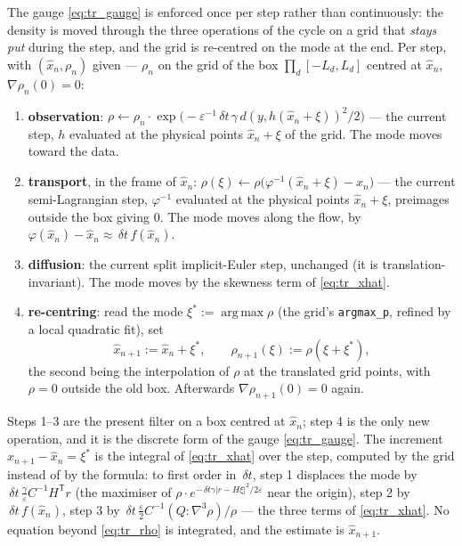 \documentclass[11pt,a4paper]{article}
\newcommand{\argmax}{\operatorname{arg\,max}}
\newcommand{\T}{^{\mathsf T}}
\newcommand{\xh}{\hat{x}}
\newcommand{\eps}{\varepsilon}
\newcommand{\abs}[1]{\left\lvert #1 \right\rvert}
\newcommand{\grad}{\nabla}
\newcommand{\dt}{\,\delta t}
\theoremstyle{plain}
\theoremstyle{definition}
\theoremstyle{remark}
\begin{document}
The gauge \eqref{eq:tr_gauge} is enforced once per step rather than continuously: the density is moved through the three operations of the cycle on a grid that \emph{stays put} during the step, and the grid is re-centred on the mode at the end. Per step, with $(\xh_n,\rho_n)$ given --- $\rho_n$ on the grid of the box $\prod_d[-L_d,L_d]$ centred at $\xh_n$, $\grad\rho_n(0)=0$:
\begin{enumerate}[leftmargin=1.5em,nosep]
  \item \textbf{observation}: $\rho\leftarrow\rho_n\cdot\exp\big(-\eps^{-1}\dt\,\gamma\,d(y,h(\xh_n+\xi))^2/2\big)$ --- the current step, $h$ evaluated at the physical points $\xh_n+\xi$ of the grid. The mode moves toward the data.
  \item \textbf{transport}, in the frame of $\xh_n$: $\rho(\xi)\leftarrow\rho\big(\varphi^{-1}(\xh_n+\xi)-\xh_n\big)$ --- the current semi-Lagrangian step, $\varphi^{-1}$ evaluated at the physical points $\xh_n+\xi$, preimages outside the box giving $0$. The mode moves along the flow, by $\varphi(\xh_n)-\xh_n\approx\dt\,f(\xh_n)$.
  \item \textbf{diffusion}: the current split implicit-Euler step, unchanged (it is translation-invariant). The mode moves by the skewness term of \eqref{eq:tr_xhat}.
  \item \textbf{re-centring}: read the mode $\xi^* := \argmax\rho$ (the grid's \texttt{argmax\_p}, refined by a local quadratic fit), set
  \begin{equation}
    \xh_{n+1} := \xh_n + \xi^*, \qquad \rho_{n+1}(\xi) := \rho(\xi+\xi^*),
    \label{eq:tr_recentre}
  \end{equation}
  the second being the interpolation of $\rho$ at the translated grid points, with $\rho=0$ outside the old box. Afterwards $\grad\rho_{n+1}(0)=0$ again.
\end{enumerate}
Steps 1--3 are the present filter on a box centred at $\xh_n$; step 4 is the only new operation, and it is the discrete form of the gauge \eqref{eq:tr_gauge}. The increment $\xh_{n+1}-\xh_n=\xi^*$ is the integral of \eqref{eq:tr_xhat} over the step, computed by the grid instead of by the formula: to first order in $\dt$, step 1 displaces the mode by $\dt\,\tfrac\gamma\eps C^{-1}H\T r$ (the maximiser of $\rho\cdot e^{-\dt\gamma\abs{r-H\xi}^2/2\eps}$ near the origin), step 2 by $\dt\,f(\xh_n)$, step 3 by $\dt\,\tfrac\eps2C^{-1}(Q\!:\!\grad^3\rho)/\rho$ --- the three terms of \eqref{eq:tr_xhat}. No equation beyond \eqref{eq:tr_rho} is integrated, and the estimate is $\xh_{n+1}$.
\end{document}
